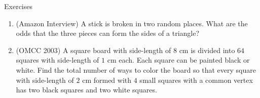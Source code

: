 \begin{xcb}{Exercises}
\begin{enumerate}
\begin{hint}
\end{hint}
\item (Amazon Interview)  A stick is broken in two random places. What are the odds that the three pieces can form the sides of a triangle? 
\begin{hint}
\end{hint}
\item (OMCC 2003)  A square board with side-length of $8$ cm is divided into $64$ squares with side-length of $1$ cm each. Each square can be painted black or white. Find the total number of ways to color the board so that every square with side-length of $2$ cm formed with $4$ small squares with a common vertex has two black squares and two white squares.
\begin{hint}
\end{hint}
\end{enumerate}
\end{xcb}